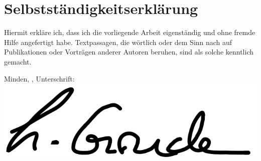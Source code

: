\chapter*{Selbstständigkeitserklärung}
Hiermit erkläre ich, dass ich die vorliegende Arbeit eigenständig und ohne fremde Hilfe 
angefertigt habe. Textpassagen, die wörtlich oder dem Sinn nach auf Publikationen oder 
Vorträgen anderer Autoren beruhen, sind als solche kenntlich gemacht.

\vspace{1cm}


\noindent
\begin{minipage}[t]{0.97\textwidth}
    Minden, \thedate, Unterschrift: \hspace{4em}\includegraphics[scale=0.3]{img/Unterschrift.png} %
\end{minipage}



